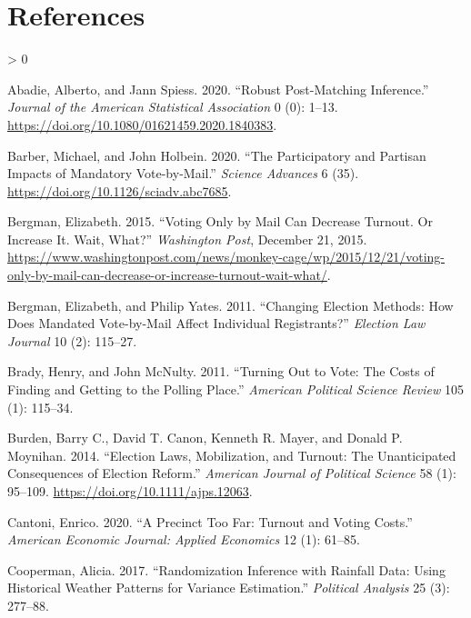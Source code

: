 \documentclass[
  12pt,
]{article}
\newlength{\cslhangindent}
\newenvironment{CSLReferences}[2] %
 {%
  \setlength{\parindent}{0pt}
  \ifodd #1 \everypar{\setlength{\hangindent}{\cslhangindent}}\ignorespaces\fi
  \ifnum #2 > 0
  \setlength{\parskip}{#2\baselineskip}
  \fi
 }%
 {}
\begin{document}
\newpage

\hypertarget{references}{%
\section*{References}\label{references}}

\hypertarget{refs}{}
\begin{CSLReferences}{1}{0}
\leavevmode\hypertarget{ref-Abadie2020}{}%
Abadie, Alberto, and Jann Spiess. 2020. {``Robust {Post}-{Matching Inference}.''} \emph{Journal of the American Statistical Association} 0 (0): 1--13. \url{https://doi.org/10.1080/01621459.2020.1840383}.

\leavevmode\hypertarget{ref-Barber2020}{}%
Barber, Michael, and John Holbein. 2020. {``The Participatory and Partisan Impacts of Mandatory Vote-by-Mail.''} \emph{Science Advances} 6 (35). \url{https://doi.org/10.1126/sciadv.abc7685}.

\leavevmode\hypertarget{ref-Bergman2015}{}%
Bergman, Elizabeth. 2015. {``Voting Only by Mail Can Decrease Turnout. {Or} Increase It. {Wait}, What?''} \emph{Washington Post}, December 21, 2015. \url{https://www.washingtonpost.com/news/monkey-cage/wp/2015/12/21/voting-only-by-mail-can-decrease-or-increase-turnout-wait-what/}.

\leavevmode\hypertarget{ref-Bergman2011}{}%
Bergman, Elizabeth, and Philip Yates. 2011. {``Changing {Election Methods}: {How Does Mandated Vote}-by-{Mail Affect Individual Registrants}?''} \emph{Election Law Journal} 10 (2): 115--27.

\leavevmode\hypertarget{ref-Brady2011}{}%
Brady, Henry, and John McNulty. 2011. {``Turning Out to Vote: {The Costs} of {Finding} and {Getting} to the {Polling Place}.''} \emph{American Political Science Review} 105 (1): 115--34.

\leavevmode\hypertarget{ref-Burden2014}{}%
Burden, Barry C., David T. Canon, Kenneth R. Mayer, and Donald P. Moynihan. 2014. {``Election {Laws}, {Mobilization}, and {Turnout}: {The Unanticipated Consequences} of {Election Reform}.''} \emph{American Journal of Political Science} 58 (1): 95--109. \url{https://doi.org/10.1111/ajps.12063}.

\leavevmode\hypertarget{ref-Cantoni2020}{}%
Cantoni, Enrico. 2020. {``A {Precinct Too Far}: {Turnout} and {Voting Costs}.''} \emph{American Economic Journal: Applied Economics} 12 (1): 61--85.

\leavevmode\hypertarget{ref-Cooperman2017}{}%
Cooperman, Alicia. 2017. {``Randomization {Inference} with {Rainfall Data}: {Using Historical Weather Patterns} for {Variance Estimation}.''} \emph{Political Analysis} 25 (3): 277--88.


\end{CSLReferences}
\end{document}
